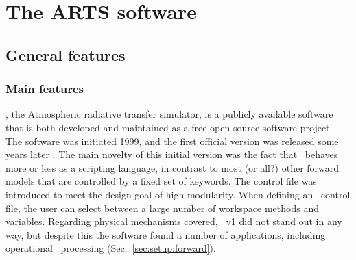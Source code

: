 \chapter{The ARTS software}
\label{chapter:arts}


\section{General features}
\label{sec:arts:features}

\subsection{Main features}
%
\ARTS, the Atmospheric radiative transfer simulator, is a publicly available
software that is both developed and maintained as a free open-source software
project. The software was initiated 1999, and the first official version was
released some years later \citep{buehler:artst:05}. The main novelty of this
initial version was the fact that \ARTS\ behaves more or less as a scripting
language, in contrast to most (or all?) other forward models that are
controlled by a fixed set of keywords. The control file was introduced to meet
the design goal of high modularity. When defining an \ARTS\ control file, the
user can select between a large number of workspace methods and variables.
Regarding physical mechanisms covered, \ARTS~v1 did not stand out in any way,
but despite this the software found a number of applications, including
operational \SMR\ processing (Sec.~\ref{sec:setup:forward}).

